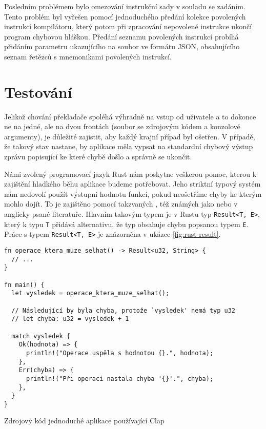Posledním problémem bylo omezování instrukční sady v souladu se zadáním. Tento problém byl vyřešen pomocí jednoduchého předání kolekce povolených instrukcí kompilátoru, který potom při zpracování nepovolené instrukce ukončí program chybovou hláškou. Předání seznamu povolených instrukcí probíhá přidáním parametru ukazujícího na soubor ve formátu JSON, obsahujícího seznam řetězců s mnemonikami povolených instrukcí.

\section{Testování}
\label{sec:asm-test}

Jelikož chování překladače spoléhá výhradně na vstup od uživatele a to dokonce ne na jedné, ale na dvou frontách (soubor se zdrojovým kódem a konzolové argumenty), je důležité zajistit, aby každý krajní případ byl ošetřen. V případě, že takový stav nastane, by aplikace měla vypsat na standardní chybový výstup zprávu popisující ke které chybě došlo a správně se ukončit.

Námi zvolený programovací jazyk Rust nám poskytne veškerou pomoc, kterou k zajištění hladkého běhu aplikace budeme potřebovat. Jeho striktní typový systém nám nedovolí použít výstupní hodnotu funkcí, pokud neošetříme chyby ke kterým mohlo dojít. To je zajištěno pomocí takzvaných , též známých jako  nebo  v anglicky psané literatuře. Hlavním takovým typem je v Rustu typ \texttt{Result<T, E>}, který k typu \texttt{T} přidává alternativu, že typ obsahuje chybu popsanou typem \texttt{E}. Práce s typem \texttt{Result<T, E>} je znázorněna v ukázce \ref{fig:rust-result}.

\begin{listing}
\begin{verbatim}
fn operace_ktera_muze_selhat() -> Result<u32, String> {
  // ...
} 

fn main() {
  let vysledek = operace_ktera_muze_selhat();
  
  // Následující by byla chyba, protože `vysledek' nemá typ u32
  // let chyba: u32 = vysledek + 1
  
  match vysledek {
    Ok(hodnota) => {
      println!("Operace uspěla s hodnotou {}.", hodnota);
    },
    Err(chyba) => {
      println!("Při operaci nastala chyba '{}'.", chyba);
    },
  }
}
\end{verbatim}
\caption{Zdrojový kód jednoduché aplikace používající Clap}
\label{fig:rust-result}
\end{listing}

